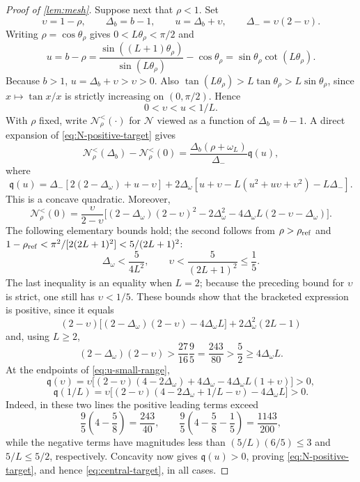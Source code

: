 \documentclass[review,hidelinks,onefignum,onetabnum]{siamart251216}
\begin{document}
\begin{proof}[Proof of \cref{lem:mesh}]
Suppose next that \(\rho<1\).  Set
\[
 \upsilon=1-\rho,\qquad \Delta_b=b-1,\qquad
 u=\Delta_b+\upsilon,\qquad \Delta_-=\upsilon(2-\upsilon).
\]
Writing \(\rho=\cos\theta_\rho\) gives
\(0<L\theta_\rho<\pi/2\) and
\[
 u=b-\rho
 =\frac{\sin((L+1)\theta_\rho)}{\sin(L\theta_\rho)}
  -\cos\theta_\rho
 =\sin\theta_\rho\cot(L\theta_\rho).
\]
Because \(b>1\), \(u=\Delta_b+\upsilon>\upsilon>0\).  Also
\(\tan(L\theta_\rho)>L\tan\theta_\rho>L\sin\theta_\rho\), since
\(x\mapsto\tan x/x\) is strictly increasing on \((0,\pi/2)\).
Hence
\begin{equation}\label{eq:u-small-range}
 0<\upsilon<u<1/L.
\end{equation}
With \(\rho\) fixed, write \(\mathcal N_\rho^{<}(\mathord\cdot)\) for
\(\mathcal N\) viewed as a function of \(\Delta_b=b-1\).
A direct expansion of \eqref{eq:N-positive-target} gives
\[
 \mathcal N_\rho^{<}(\Delta_b)-\mathcal N_\rho^{<}(0)
 =\frac{\Delta_b(\rho+\omega_L)}{\Delta_-}\mathfrak q(u),
\]
where
\[
 \mathfrak q(u)=\Delta_-[2(2-\Delta_\omega)+u-\upsilon]
 +2\Delta_\omega
 [u+\upsilon-L(u^2+u\upsilon+\upsilon^2)-L\Delta_-].
\]
This is a concave quadratic.  Moreover,
\[
 \mathcal N_\rho^{<}(0)=\frac{\upsilon}{2-\upsilon}
 \bigl[(2-\Delta_\omega)(2-\upsilon)^2
 -2\Delta_\omega^2
 -4\Delta_\omega L(2-\upsilon-\Delta_\omega)\bigr].
\]
The following elementary bounds hold; the second follows from
\(\rho>\rho_{\rm ref}\) and
\(1-\rho_{\rm ref}<\pi^2/[2(2L+1)^2]<5/(2L+1)^2\):
\begin{equation}\label{eq:Delta-upsilon-bounds}
 \Delta_\omega<\frac5{4L^2},\qquad
 \upsilon<\frac5{(2L+1)^2}\leq\frac15.
\end{equation}
The last inequality is an equality when \(L=2\); because the preceding
bound for \(\upsilon\) is strict, one still has \(\upsilon<1/5\).  These bounds
show that the bracketed expression is positive, since it equals
\[
 (2-\upsilon)
 \bigl[(2-\Delta_\omega)(2-\upsilon)-4\Delta_\omega L\bigr]
 +2\Delta_\omega^2(2L-1)
\]
and, using \(L\geq2\),
\[
 (2-\Delta_\omega)(2-\upsilon)
 >\frac{27}{16}\frac95=\frac{243}{80}
 >\frac52\geq4\Delta_\omega L.
\]
At the endpoints of
\eqref{eq:u-small-range},
\[
 \mathfrak q(\upsilon)=\upsilon
 \bigl[(2-\upsilon)(4-2\Delta_\omega)
 +4\Delta_\omega-4\Delta_\omega L(1+\upsilon)\bigr]>0,
\]
\[
 \mathfrak q(1/L)=\upsilon
 \bigl[(2-\upsilon)(4-2\Delta_\omega+1/L-\upsilon)
 -4\Delta_\omega L\bigr]>0.
\]
Indeed, in these two lines the positive leading terms exceed
\[
 \frac95\left(4-\frac58\right)=\frac{243}{40},
 \qquad
 \frac95\left(4-\frac58-\frac15\right)=\frac{1143}{200},
\]
while the negative terms have magnitudes less than
\((5/L)(6/5)\leq3\) and \(5/L\leq5/2\), respectively.  Concavity now gives
\(\mathfrak q(u)>0\), proving \eqref{eq:N-positive-target}, and hence
\eqref{eq:central-target}, in all cases.


\end{proof}
\end{document}
